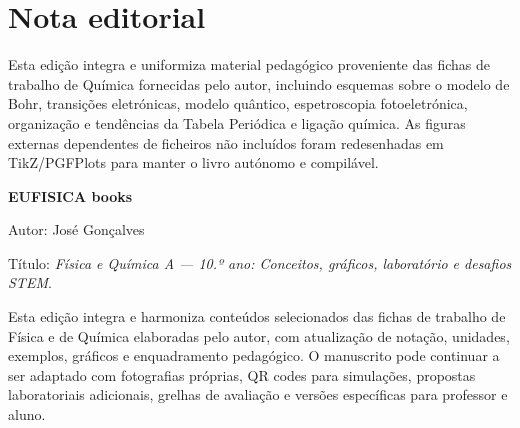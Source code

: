 \documentclass[11pt,a4paper,oneside]{book}
\begin{document}
\chapter*{Nota editorial}
Esta edição integra e uniformiza material pedagógico proveniente das fichas de trabalho de Química fornecidas pelo autor, incluindo esquemas sobre o modelo de Bohr, transições eletrónicas, modelo quântico, espetroscopia fotoeletrónica, organização e tendências da Tabela Periódica e ligação química. As figuras externas dependentes de ficheiros não incluídos foram redesenhadas em TikZ/PGFPlots para manter o livro autónomo e compilável.


\textbf{EUFISICA books}\par
Autor: José Gonçalves\par
Título: \textit{Física e Química A — 10.º ano: Conceitos, gráficos, laboratório e desafios STEM}.\par

Esta edição integra e harmoniza conteúdos selecionados das fichas de trabalho de Física e de Química elaboradas pelo autor, com atualização de notação, unidades, exemplos, gráficos e enquadramento pedagógico. O manuscrito pode continuar a ser adaptado com fotografias próprias, QR codes para simulações, propostas laboratoriais adicionais, grelhas de avaliação e versões específicas para professor e aluno.
\end{document}
